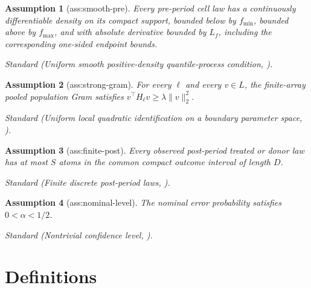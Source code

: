 \documentclass{article}
\newtheorem{assumption}{Assumption}
\begin{document}
\begin{assumption}[ass:smooth-pre]\label{ass:smooth-pre}
Every pre-period cell law has a continuously differentiable density on its compact support, bounded below by \(f_{\min}\), bounded above by \(f_{\max}\), and with absolute derivative bounded by \(L_f\), including the corresponding one-sided endpoint bounds.
\par\smallskip\noindent\emph{Standard} (Uniform smooth positive-density quantile-process condition, \cite{VanDerVaartWellner1996}).
\end{assumption}

\begin{assumption}[ass:strong-gram]\label{ass:strong-gram}
For every \(\ell\) and every \(v\in L\), the finite-array pooled population Gram satisfies \(v^\top H_\ell v\geq\lambda\|v\|_2^2\).
\par\smallskip\noindent\emph{Standard} (Uniform local quadratic identification on a boundary parameter space, \cite{Andrews1999}).
\end{assumption}

\begin{assumption}[ass:finite-post]\label{ass:finite-post}
Every observed post-period treated or donor law has at most \(S\) atoms in the common compact outcome interval of length \(D\).
\par\smallskip\noindent\emph{Standard} (Finite discrete post-period laws, \cite{Gunsilius2023}).
\end{assumption}

\begin{assumption}[ass:nominal-level]\label{ass:nominal-level}
The nominal error probability satisfies \(0<\alpha<1/2\).
\par\smallskip\noindent\emph{Standard} (Nontrivial confidence level, \cite{RobinsVanDerVaart2006}).
\end{assumption}

\section{Definitions}
\end{document}
